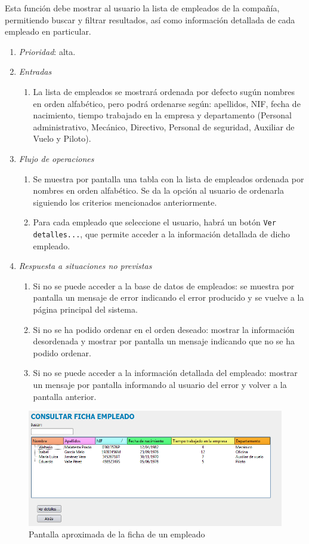 	Esta función debe mostrar al usuario la lista de empleados de la compañía, permitiendo buscar y filtrar resultados, así como información detallada de cada empleado en particular.
		
	\begin{enumerate}
		\item \textit{Prioridad}: alta.
		\item \textit{Entradas}
			\begin{enumerate}
				\item La lista de empleados se mostrará ordenada por defecto sugún nombres en orden alfabético, pero podrá ordenarse según: apellidos, NIF, fecha de nacimiento, tiempo trabajado en la empresa y departamento (Personal administrativo, Mecánico, Directivo, Personal de seguridad, Auxiliar de Vuelo y Piloto).							
			\end{enumerate}
		\item \textit{Flujo de operaciones}
			\begin{enumerate}
				\item Se muestra por pantalla una tabla con la lista de empleados ordenada por nombres en orden alfabético. Se da la opción al usuario de ordenarla siguiendo los criterios mencionados anteriormente.
				\item Para cada empleado que seleccione el usuario, habrá un botón \verb|Ver detalles...|, que permite acceder a la información detallada de dicho empleado.
			\end{enumerate}
		\item \textit{Respuesta a situaciones no previstas}
			\begin{enumerate}
				\item Si no se puede acceder a la base de datos de empleados: se muestra por pantalla un mensaje de error indicando el error producido y se vuelve a la página principal del sistema.
				\item Si no se ha podido ordenar en el orden deseado: mostrar la información desordenada y mostrar por pantalla un mensaje indicando que no se ha podido ordenar.
				\item Si no se puede acceder a la información detallada del empleado: mostrar un mensaje por pantalla informando al usuario del error y volver a la pantalla anterior.
			\end{enumerate}
	\end{enumerate}
	\begin{figure}[ht]\centering
	\includegraphics[scale=.6]{imagenes/consultarFichaEmpleadoImagen.png}
	\caption{Pantalla aproximada de la ficha de un empleado}
\end{figure}
								
